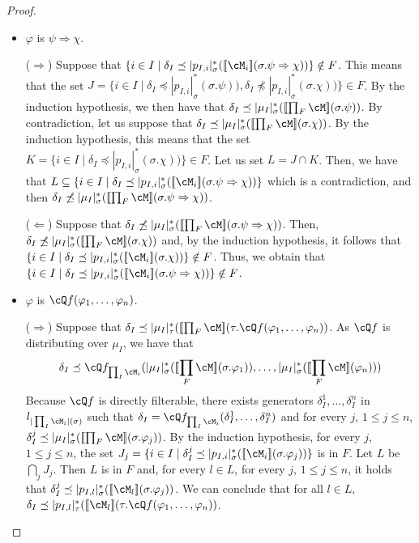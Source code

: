 \documentclass[preprint,3p,times]{elsarticle}
\def\sem#1{[\![ #1 ] \!]}
\begin{document}
\begin{proof}
\begin{itemize}
        
        \item $\varphi$ is $\psi \Rightarrow \chi$.

        \medskip
        ($\Rightarrow$) Suppose that $\{i \in I \mid \delta_I \preceq |p_{I,i}|^*_\sigma(\sem{\cM_i}(\sigma.\psi \Rightarrow \chi))\} \notin F$. This means that the set $J = \{i \in I \mid \delta_I \preceq |p_{I,i}|^*_\sigma(\sigma.\psi)),\delta_I \not\preceq |p_{I,i}|^*_\sigma(\sigma.\chi))\} \in F$. By the induction hypothesis, we then have that $\delta_I \preceq |\mu_I|^*_\sigma(\sem{\prod_F \cM}(\sigma.\psi))$. By contradiction, let us suppose that $\delta_I \preceq |\mu_I|^*_\sigma(\sem{\prod_F \cM}(\sigma.\chi))$. By the induction hypothesis, this means that the set $K = \{i \in I \mid \delta_I \preceq |p_{I,i}|^*_\sigma(\sigma.\chi))\} \in F$. Let us set $L = J \cap K$. Then, we have that $L \subseteq \{i \in I \mid \delta_I \preceq |p_{I,i}|^*_\sigma(\sem{\cM_i}(\sigma.\psi \Rightarrow \chi))\}$ which is a contradiction, and then $\delta_I \not\preceq |\mu_I|^*_\sigma(\sem{\prod_F \cM}(\sigma.\psi \Rightarrow \chi))$.

        \medskip
        ($\Leftarrow$) Suppose that $\delta_I \not\preceq |\mu_I|^*_\sigma(\sem{\prod_F \cM}(\sigma.\psi \Rightarrow \chi))$. Then, $\delta_I \not\preceq |\mu_I|^*_\sigma(\sem{\prod_F \cM}(\sigma.\chi))$ and, by the induction hypothesis, it follows that $\{i \in I \mid \delta_I \preceq |p_{I,i}|^*_\sigma(\sem{\cM_i}(\sigma.\chi))\} \notin F$. Thus, we obtain that $\{i \in I \mid \delta_I \preceq |p_{I,i}|^*_\sigma(\sem{\cM_i}(\sigma.\psi \Rightarrow \chi))\} \notin F$. 

        \item $\varphi$ is $\cQ f(\varphi_1,\ldots,\varphi_n)$. 

        \medskip
        ($\Rightarrow$) Suppose that $\delta_I \preceq |\mu_I|^*_\tau(\sem{\prod_F \cM}(\tau.\cQ f(\varphi_1,\ldots,\varphi_n))$. As $\cQ f$ is distributing over $\mu_I$, we have that 
        \[
        \delta_I \preceq \cQ f_{\prod_I \cM_i}(|\mu_I|^*_\sigma(\sem{\prod_F \cM}(\sigma.\varphi_1)),\ldots,|\mu_I|^*_\sigma(\sem{\prod_F \cM}(\varphi_n)))
        \]
        Because $\cQ f$ is directly filterable, there exists generators $\delta^1_I,\ldots,\delta^n_I$ in $l_{|\prod_I \cM_i|(\sigma)}$ such that $\delta_I = \cQ f_{\prod_I \cM_i}(\delta^1_I,\ldots,\delta^n_I)$ and for every $j$, $1 \leq j \leq n$, $\delta^j_I \preceq |\mu_I|^*_\sigma(\sem{\prod_F \cM}(\sigma.\varphi_j))$. By the induction hypothesis, for every $j$, $1 \leq j \leq n$, the set $J_j = \{i \in I \mid \delta^j_I \preceq |p_{I,i}|^*_\sigma(\sem{\cM_i}(\sigma.\varphi_j))\}$ is in $F$. Let $L$ be $\bigcap_{j} J_j$. Then \(L\) is in \(F\) and, for every $l \in L$, for every $j$, $1 \leq j \leq n$, it holds that $\delta^j_I \preceq |p_{I,l}|^*_\sigma(\sem{\cM_l}(\sigma.\varphi_j))$. We can conclude that for all \(l \in L\), $\delta_I \preceq |p_{I,l}|^*_\tau(\sem{\cM_l}(\tau.\cQ f(\varphi_1,\ldots,\varphi_n))$. 


\end{itemize}
\end{proof}
\end{document}
